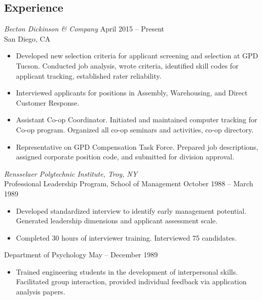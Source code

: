 \documentclass[10pt]{res} %
\begin{document}
\begin{resume}
\section{Experience} 

\vspace{8pt} %

{\sl Becton Dickinson \& Company} \hfill April 2015 -- Present \\
San Diego, CA 
\begin{itemize} \itemsep -2pt %
\item Developed new selection criteria for applicant screening and selection at GPD Tucson. Conducted job analysis, wrote criteria, identified skill codes for applicant tracking, established rater reliability. 
\item Interviewed applicants for positions in Assembly, Warehousing, and Direct Customer Response. 
\item Assistant Co-op Coordinator. Initiated and maintained computer tracking for Co-op program. Organized all co-op seminars and activities, co-op directory. 
\item Representative on GPD Compensation Task Force. Prepared job descriptions, assigned corporate position code, and submitted for division approval. 
\end{itemize}

{\sl Rensselaer Polytechnic Institute, Troy, NY} \\[2pt]
Professional Leadership Program, School of Management \hfill October 1988 -- March 1989 
\begin{itemize} \itemsep -2pt %
\item Developed standardized interview to identify early management potential. Generated leadership dimensions and applicant assessment scale. 
\item Completed 30 hours of interviewer training. Interviewed 75 candidates. 
\end{itemize} 
\vspace{-6pt} %
Department of Psychology \hfill May -- December 1989 
\begin{itemize} 
\item Trained engineering students in the development of interpersonal skills. Facilitated group interaction, provided individual feedback via application analysis papers. 
\end{itemize}
 

\end{resume}
\end{document}
